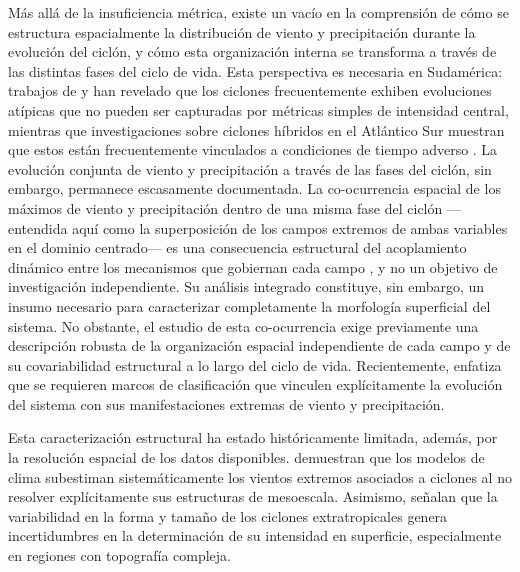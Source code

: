 Más allá de la insuficiencia métrica, existe un vacío en la comprensión de cómo se estructura espacialmente la distribución de viento y precipitación durante la evolución del ciclón, y cómo esta organización interna se transforma a través de las distintas fases del ciclo de vida. 
Esta perspectiva es necesaria en Sudamérica: trabajos de \citet{gozzo2013air} y \citet{reboita2022from} han revelado que los ciclones frecuentemente exhiben evoluciones atípicas que no pueden ser capturadas por métricas simples de intensidad central, mientras que investigaciones sobre ciclones híbridos en el Atlántico Sur muestran que estos están frecuentemente vinculados a condiciones de tiempo adverso \citep{marrafon2022classificacao}. 
La evolución conjunta de viento y precipitación a través de las fases del ciclón, sin embargo, permanece escasamente documentada. 
% 
La co-ocurrencia espacial de los máximos de viento y precipitación dentro de una misma fase del ciclón —entendida aquí como la superposición de los campos extremos de ambas variables en el dominio centrado— es una consecuencia estructural del acoplamiento dinámico entre los mecanismos que gobiernan cada campo \citep{chen2025characteristics}, y no un objetivo de investigación independiente. Su análisis integrado constituye, sin embargo, un insumo necesario para caracterizar completamente la morfología superficial del sistema.
% 
No obstante, el estudio de esta co-ocurrencia exige previamente una descripción robusta de la organización espacial independiente de cada campo y de su covariabilidad estructural a lo largo del ciclo de vida. Recientemente, \citet{han2025system} enfatiza que se requieren marcos de clasificación que vinculen explícitamente la evolución del sistema con sus manifestaciones extremas de viento y precipitación.

Esta caracterización estructural ha estado históricamente limitada, además, por la resolución espacial de los datos disponibles. \citet{priestley2022improved} demuestran que los modelos de clima subestiman sistemáticamente los vientos extremos asociados a ciclones al no resolver explícitamente sus estructuras de mesoescala. Asimismo, \citet{neu2013intercomparison} señalan que la variabilidad en la forma y tamaño de los ciclones extratropicales genera incertidumbres en la determinación de su intensidad en superficie, especialmente en regiones con topografía compleja.


